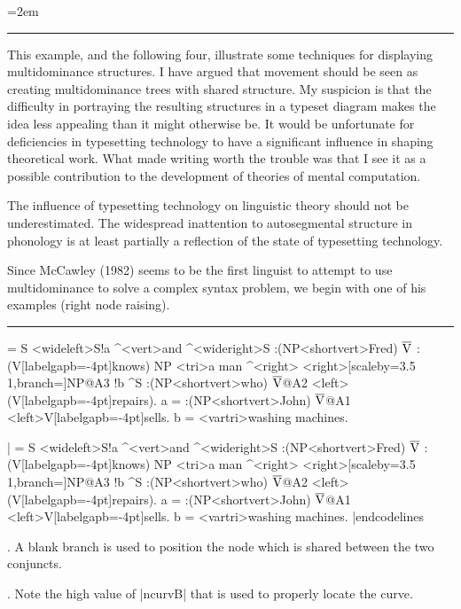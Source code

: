\parindent=2em

\example

\hrule
\medskip
\noindent This example, and the following four, illustrate some
techniques for displaying multidominance structures.  I have
argued that movement should be seen as creating multidominance
trees with shared structure.  My suspicion is that the difficulty
in portraying the resulting structures in a typeset diagram makes
the idea less appealing than it might otherwise be.  It would be
unfortunate for deficiencies in typesetting technology to have a
significant influence in shaping theoretical work.  What made
writing \pstjtree\/ worth the trouble was that I see it as a
possible contribution to the development of theories of mental
computation.

The influence of typesetting technology on linguistic theory
should not be underestimated.  The widespread inattention to
autosegmental structure in phonology is at least partially
a reflection of the state of typesetting technology.

Since McCawley (1982) seems to be the first linguist to attempt
to use multidominance to solve a complex syntax problem, we begin
with one of his examples (right node raising).
\medskip
\hrule

\bigskip
\noindent\hfil
\jtree[xunit=2.45em,yunit=1.4em,dirA=(1:-1),nodesep=0]
\def\\{[labelgapb=-4pt]}%
\def\V{$\rm \overline V$}%
\! = {S}
   <wideleft>{S}!a ^<vert>{and} ^<wideright>{S}
   :({NP}<shortvert>{Fred}) {\V}
   :({V}\\{knows}) {NP}
   <tri>{a man} ^<right>
   <right>[scaleby=3.5 1,branch=\blank]{NP}@A3 !b ^{S}
   :({NP}<shortvert>{who}) {\V}@A2
   <left>({V}\\{repairs}).
\!a = :({NP}<shortvert>{John}) {\V}@A1
   <left>{V}\\{sells}.
\!b = <vartri>{washing machines}.
\endjtree

\vfil\break

\codelines|
\jtree[xunit=2.45em,yunit=1.4em,dirA=(1:-1),nodesep=0]
\def\\{[labelgapb=-4pt]}%
\def\V{$\rm \overline V$}%
\! = {S}
   <wideleft>{S}!a ^<vert>{and} ^<wideright>{S}
   :({NP}<shortvert>{Fred}) {\V}
   :({V}\\{knows}) {NP}
   <tri>{a man} ^<right>
   <right>[scaleby=3.5 1,branch=\blank]{NP}@A3 !b ^{S}
   :({NP}<shortvert>{who}) {\V}@A2
   <left>({V}\\{repairs}).
\!a = :({NP}<shortvert>{John}) {\V}@A1
   <left>{V}\\{sells}.
\!b = <vartri>{washing machines}.
\endjtree
|endcodelines

. A blank branch is used to position the node which is shared
between the two conjuncts.

. Note the high value of |ncurvB| that is used to properly
locate the curve.
